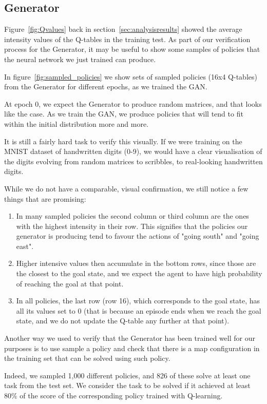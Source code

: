 \subsection{Generator}
Figure~\ref{fig:Qvalues} back in section~\ref{sec:analysisresults} showed the average intensity values of the Q-tables in the training test. As part of our verification process for the Generator, it may be useful to show some samples of policies that the neural network we just trained can produce.

In figure~\ref{fig:sampled_policies} we show sets of sampled policies (16x4 Q-tables) from the Generator for different epochs, as we trained the GAN.

At epoch 0, we expect the Generator to produce random matrices, and that looks like the case. As we train the GAN, we produce policies that will tend to fit within the initial distribution more and more.

It is still a fairly hard task to verify this visually. If we were training on the MNIST dataset of handwritten digits (0-9), we would have a clear visualisation of the digits evolving from random matrices to scribbles, to real-looking handwritten digits.

While we do not have a comparable, visual confirmation, we still notice a few things that are promising:
\begin{enumerate}
	\item In many sampled policies the second column or third column are the ones with the highest intensity in their row. This signifies that the policies our generator is producing tend to favour the actions of "going south" and "going east".
	\item Higher intensive values then accumulate in the bottom rows, since those are the closest to the goal state, and we expect the agent to have high probability of reaching the goal at that point.
	\item In all policies, the last row (row 16), which corresponds to the goal state, has all its values set to 0 (that is because an episode ends when we reach the goal state, and we do not update the Q-table any further at that point).
\end{enumerate}

Another way we used to verify that the Generator has been trained well for our purposes is to use sample a policy and check that there is a map configuration in the training set that can be solved using such policy.

Indeed, we sampled 1,000 different policies, and 826 of these solve at least one task from the test set. We consider the task to be solved if it achieved at least 80\% of the score of the corresponding policy trained with Q-learning.

